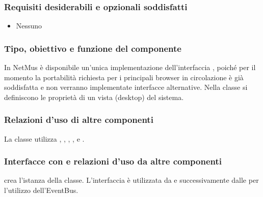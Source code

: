 \subsubsection*{Requisiti desiderabili e opzionali soddisfatti}
\begin{itemize}
	\item Nessuno
\end{itemize}
\subsubsection*{Tipo, obiettivo e funzione del componente}
In NetMus \`e disponibile un'unica implementazione dell'interfaccia
, poich\'e per il momento la portabilit\`a richiesta per i
principali browser in circolazione \`e gi\`a soddisfatta e non verranno
implementate interfacce alternative. Nella classe si definiscono
le propriet\`a di un vista (desktop) del sistema.
\subsubsection*{Relazioni d'uso di altre componenti}
La classe utilizza , , ,
,  e
.
\subsubsection*{Interfacce con e relazioni d'uso da altre componenti}
 crea l'istanza della classe. L'interfaccia  \`e
utilizzata da  e successivamente dalle  per
l'utilizzo dell'EventBus.

